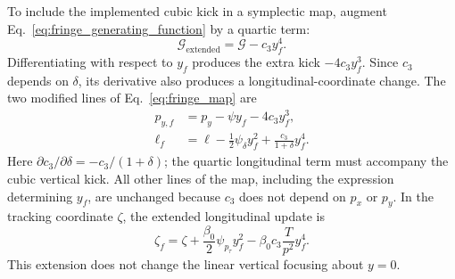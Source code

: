 To include the implemented cubic kick in a symplectic map, augment
Eq.~\eqref{eq:fringe_generating_function} by a quartic term:
\begin{equation}
 \mathcal G_{\mathrm{extended}}=\mathcal G-c_3y_f^4.
\end{equation}
Differentiating with respect to $y_f$ produces the extra kick
$-4c_3y_f^3$. Since $c_3$ depends on $\delta$, its derivative also produces
a longitudinal-coordinate change. The two modified lines of
Eq.~\eqref{eq:fringe_map} are
\begin{align}
 p_{y,f}&=p_y-\psi y_f-4c_3y_f^3,
 \label{eq:fringe_extended_py}\\
 \ell_f&=\ell-\frac12\psi_\delta y_f^2
                   +\frac{c_3}{1+\delta}y_f^4.
 \label{eq:fringe_extended_map}
\end{align}
Here $\partial c_3/\partial\delta=-c_3/(1+\delta)$; the quartic longitudinal
term must accompany the cubic vertical kick. All other lines of the map,
including the expression determining $y_f$, are unchanged because $c_3$
does not depend on $p_x$ or $p_y$. In the tracking coordinate $\zeta$, the
extended longitudinal update is
\begin{equation}
 \zeta_f=\zeta+\frac{\beta_0}{2}\psi_{p_\tau}y_f^2
              -\beta_0c_3\frac{T}{p^2}y_f^4.
\end{equation}
This extension does not change the linear vertical focusing about $y=0$.

